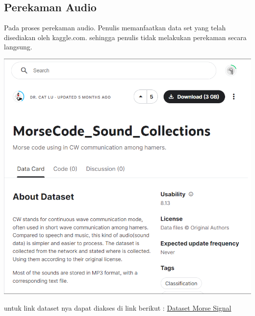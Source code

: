 \documentclass[]{article}
\begin{document}
\subsection{Perekaman Audio}
Pada proses perekaman audio. Penulis memanfaatkan data set yang telah disediakan oleh kaggle.com. sehingga penulis tidak melakukan perekaman secara langsung.
\begin{center}
	\includegraphics[width=0.7\linewidth]{img/screenshot001}
\end{center}
untuk link dataset nya dapat diakses di link berikut : 
\href{https://www.kaggle.com/datasets/bg4xsd/morse-sound}{Dataset Morse Signal}
\end{document}
